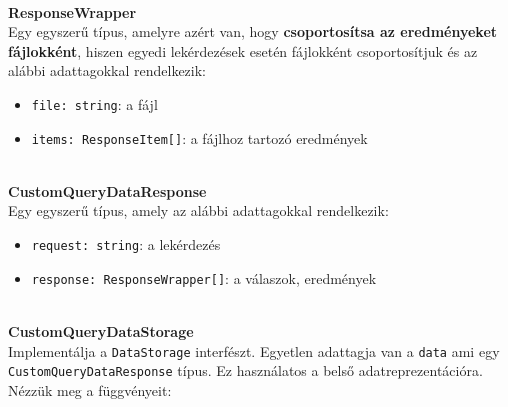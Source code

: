 \\
\vspace{14pt}
\textbf{ResponseWrapper}
\\

Egy egyszerű típus, amelyre azért van, hogy \textbf{csoportosítsa az eredményeket fájlokként}, hiszen egyedi lekérdezések esetén fájlokként csoportosítjuk és az alábbi adattagokkal rendelkezik:

\begin{itemize}
    \item \lstinline{file: string}: a fájl
    
    \item \lstinline{items: ResponseItem[]}: a fájlhoz tartozó eredmények

\end{itemize}






\\
\vspace{14pt}
\textbf{CustomQueryDataResponse}
\\

Egy egyszerű típus, amely az alábbi adattagokkal rendelkezik:

\begin{itemize}
    \item \lstinline{request: string}: a lekérdezés
    
    \item \lstinline{response: ResponseWrapper[]}: a válaszok, eredmények

\end{itemize}








\\
\vspace{14pt}
\textbf{CustomQueryDataStorage}
\\


Implementálja a \lstinline{DataStorage} interfészt. Egyetlen adattagja van a \lstinline{data} ami egy \lstinline{CustomQueryDataResponse} típus. Ez használatos a belső adatreprezentációra. Nézzük meg a függvényeit:

